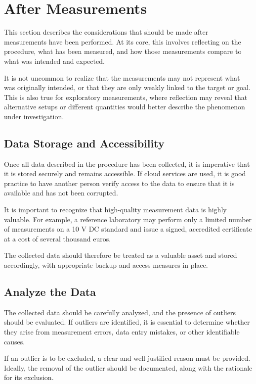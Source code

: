 \section{After Measurements}
This section describes the considerations that should be made after measurements have been performed. At its core, this involves reflecting on the procedure, what has been measured, and how those measurements compare to what was intended and expected.

It is not uncommon to realize that the measurements may not represent what was originally intended, or that they are only weakly linked to the target or goal. This is also true for exploratory measurements, where reflection may reveal that alternative setups or different quantities would better describe the phenomenon under investigation.


\subsection{Data Storage and Accessibility}
Once all data described in the procedure has been collected, it is imperative that it is stored securely and remains accessible. If cloud services are used, it is good practice to have another person verify access to the data to ensure that it is available and has not been corrupted.

It is important to recognize that high-quality measurement data is highly valuable. For example, a reference laboratory may perform only a limited number of measurements on a 10 V DC standard and issue a signed, accredited certificate at a cost of several thousand euros. 

The collected data should therefore be treated as a valuable asset and stored accordingly, with appropriate backup and access measures in place.

\subsection{Analyze the Data}
The collected data should be carefully analyzed, and the presence of outliers should be evaluated. If outliers are identified, it is essential to determine whether they arise from measurement errors, data entry mistakes, or other identifiable causes.

If an outlier is to be excluded, a clear and well-justified reason must be provided. Ideally, the removal of the outlier should be documented, along with the rationale for its exclusion.

